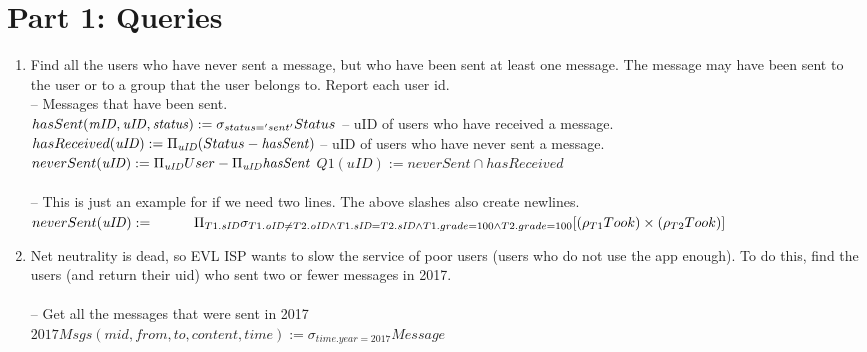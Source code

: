 \documentclass{article}
\newcommand{\var}[1]{\mathit{#1}}
\begin{document}
\section*{Part 1: Queries}

\begin{enumerate}

\item   %
Find all the users who have never sent a message, but who have been sent at least one message. The message may have been sent to the user or to a group that the user belongs to. Report each user id. \\

{\large %
--  Messages that have been sent. \\ [5pt]
$
hasSent(\var{mID}, \var{uID}, \var{status}) :=  
	\sigma_{status = 'sent'} 
	Status \\[10pt]
$
-- uID of users who have received a message. \\[5pt]
$
hasReceived(\var{uID}) := 
	\Pi_{\var{uID}} 
	(Status - \var{hasSent}) 
	\\[10pt]
$
-- uID of users who have never sent a message. \\[5pt]
$
neverSent(\var{uID}) := 
	\Pi_{\var{uID}} User - \Pi_\var{uID}\var{hasSent} 
	\\[10pt]
$
$
Q1(\var{uID}) :=
	neverSent \cap hasReceived
$\\\\


-- This is just an example for if we need two lines. The above slashes also create newlines.\\
$
neverSent(\var{uID}) := \\[5pt]  %
	\hspace*{1cm}  %
	\Pi_{T1.\var{sID}} 
	\sigma_{
		T1.\var{oID} \neq T2.\var{oID} \wedge 
		T1.\var{sID} = T2.\var{sID} \wedge 
		T1.grade = 100 \wedge T2.grade = 100} 
	[ (\rho_{T1}Took) \times (\rho_{T2}Took) ] \\[5pt]
$
} %


\item   %
Net neutrality is dead, so EVL ISP wants to slow the service of poor users (users who do not use the app enough). To do this, find the users (and return their uid) who sent two or fewer messages in 2017.\\\\
{\large
\hspace*{1cm} -- Get all the messages that were sent in 2017 \\ [5pt]
$
2017Msgs(\var{mid}, \var{from}, \var{to}, \var{content}, \var{time}) :=
	\sigma_{time.year = 2017} Message
$\\

}
\end{enumerate}
\end{document}
